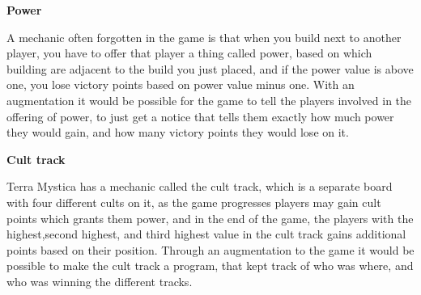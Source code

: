 \textbf{Power}

A mechanic often forgotten in the game is that when you build next to another player, you have to offer that player a thing called power, based on which building are adjacent to the build you just placed, and if the power value is above one, you lose victory points based on power value minus one. With an augmentation it would be possible for the game to tell the players involved in the offering of power, to just get a notice that tells them exactly how much power they would gain, and how many victory points they would lose on it.

\textbf{Cult track}

Terra Mystica has a mechanic called the cult track, which is a separate board with four different cults on it, as the game progresses players may gain cult points which grants them power, and in the end of the game, the players with the highest,second highest, and third highest value in the cult track gains additional points based on their position. Through an augmentation to the game it would be possible to make the cult track a program, that kept track of who was where, and who was winning the different tracks. 